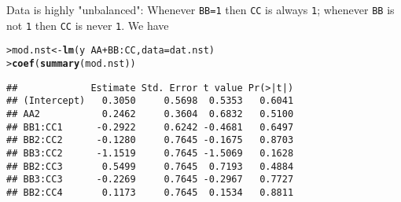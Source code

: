 \documentclass[11pt]{article}\usepackage[]{graphicx}\usepackage[]{color}
\makeatletter
\newcommand{\hlopt}[1]{\textcolor[rgb]{0,0,0}{#1}}%
\newcommand{\hlstd}[1]{\textcolor[rgb]{0.345,0.345,0.345}{#1}}%
\newcommand{\hlkwb}[1]{\textcolor[rgb]{0.69,0.353,0.396}{#1}}%
\newcommand{\hlkwc}[1]{\textcolor[rgb]{0.333,0.667,0.333}{#1}}%
\newcommand{\hlkwd}[1]{\textcolor[rgb]{0.737,0.353,0.396}{\textbf{#1}}}%
\newenvironment{kframe}{%
 \def\at@end@of@kframe{}%
 \ifinner\ifhmode%
  \def\at@end@of@kframe{\end{minipage}}%
  \begin{minipage}{\columnwidth}%
 \fi\fi%
 \def\FrameCommand##1{\hskip\@totalleftmargin \hskip-\fboxsep
 \colorbox{shadecolor}{##1}\hskip-\fboxsep
     \hskip-\linewidth \hskip-\@totalleftmargin \hskip\columnwidth}%
 \MakeFramed {\advance\hsize-\width
   \@totalleftmargin\z@ \linewidth\hsize
   \@setminipage}}%
 {\par\unskip\endMakeFramed%
 \at@end@of@kframe}
\newenvironment{knitrout}{}{} %
\renewenvironment{knitrout}{
  \begin{oldknitrout}
    \footnotesize
    \topsep=0pt
}{
  \end{oldknitrout}
}
\makeatother
\begin{document}
Data is highly "unbalanced":
Whenever \verb|BB=1| then \verb|CC| is always \verb|1|; whenever
\verb|BB| is not \verb|1| then \verb|CC| is never \verb|1|.
We have
\begin{knitrout}
\color{fgcolor}\begin{kframe}
\begin{alltt}
\hlstd{> }\hlstd{mod.nst}  \hlkwb{<-} \hlkwd{lm}\hlstd{(y} \hlopt{~} \hlstd{AA} \hlopt{+} \hlstd{BB} \hlopt{:} \hlstd{CC,} \hlkwc{data}\hlstd{=dat.nst)}
\hlstd{> }\hlkwd{coef}\hlstd{(}\hlkwd{summary}\hlstd{(mod.nst))}
\end{alltt}
\begin{verbatim}
##             Estimate Std. Error t value Pr(>|t|)
## (Intercept)   0.3050     0.5698  0.5353   0.6041
## AA2           0.2462     0.3604  0.6832   0.5100
## BB1:CC1      -0.2922     0.6242 -0.4681   0.6497
## BB2:CC2      -0.1280     0.7645 -0.1675   0.8703
## BB3:CC2      -1.1519     0.7645 -1.5069   0.1628
## BB2:CC3       0.5499     0.7645  0.7193   0.4884
## BB3:CC3      -0.2269     0.7645 -0.2967   0.7727
## BB2:CC4       0.1173     0.7645  0.1534   0.8811
\end{verbatim}
\end{kframe}
\end{knitrout}
\end{document}
